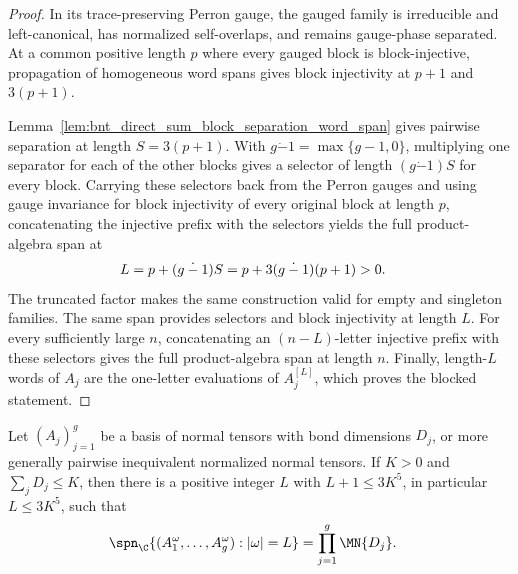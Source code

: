 \begin{proof}\leanok
    In its trace-preserving Perron gauge, the gauged family is irreducible and
    left-canonical, has normalized self-overlaps, and remains gauge-phase
    separated. At a common positive length $p$ where every gauged block is
    block-injective, propagation of homogeneous word spans gives block
    injectivity at $p+1$ and $3(p+1)$.

    Lemma~\ref{lem:bnt_direct_sum_block_separation_word_span} gives pairwise
    separation at length $S=3(p+1)$. With
    $g\mathbin{\dot-}1=\max\{g-1,0\}$, multiplying one separator for each of
    the other blocks gives a selector of length $(g\mathbin{\dot-}1)S$ for
    every block. Carrying these selectors back from the Perron gauges and using
    gauge invariance for block injectivity of every original block at length
    $p$, concatenating the injective prefix with the selectors yields the full
    product-algebra span at
    \begin{align}
        L
         & =p+(g\mathbin{\dot-}1)S
        =p+3(g\mathbin{\dot-}1)(p+1)>0.
        \notag
    \end{align}
    The truncated factor makes the same construction valid for empty and
    singleton families. The same span provides selectors and block
    injectivity at length $L$. For every sufficiently large $n$, concatenating
    an $(n-L)$-letter injective prefix with these selectors gives the full
    product-algebra span at length $n$. Finally, length-$L$ words of $A_j$ are
    the one-letter evaluations of $A_j^{[L]}$, which proves the blocked
    statement.
\end{proof}

\begin{lemma}
    \label{thm:cpsv_bnt_sharp_span_ambient_cap}
    \leanok
    Let $(A_j)_{j=1}^{g}$ be a basis of normal tensors with bond dimensions
    $D_j$, or more generally pairwise inequivalent normalized normal tensors.
    If $K>0$ and $\sum_jD_j\leq K$, then there is a positive integer
    $L$ with $L+1\leq3K^5$, in particular $L\leq3K^5$, such that
    \begin{align}
        \spn_{\C}\{(A_1^\omega,\ldots,A_g^\omega):|\omega|=L\}
         & =\prod_{j=1}^{g}\MN{D_j}.
        \notag
    \end{align}
\end{lemma}

